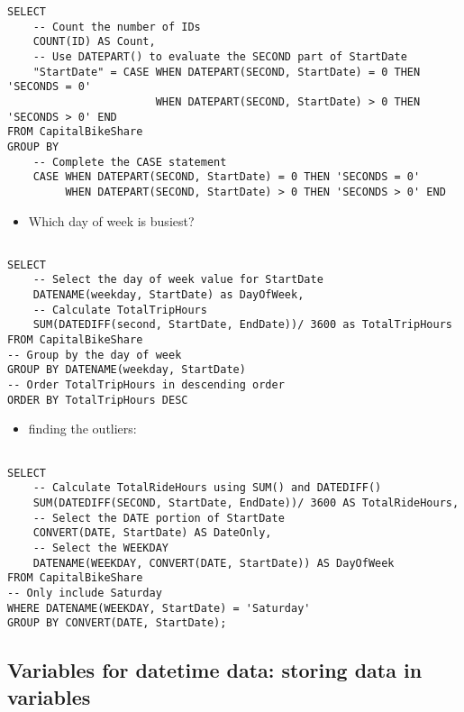 \documentclass[]{book}
\providecommand{\tightlist}{%
  \setlength{\itemsep}{0pt}\setlength{\parskip}{0pt}}
\begin{document}
\begin{verbatim}
SELECT
	-- Count the number of IDs
	COUNT(ID) AS Count,
    -- Use DATEPART() to evaluate the SECOND part of StartDate
    "StartDate" = CASE WHEN DATEPART(SECOND, StartDate) = 0 THEN 'SECONDS = 0'
					   WHEN DATEPART(SECOND, StartDate) > 0 THEN 'SECONDS > 0' END
FROM CapitalBikeShare
GROUP BY
    -- Complete the CASE statement
	CASE WHEN DATEPART(SECOND, StartDate) = 0 THEN 'SECONDS = 0'
		 WHEN DATEPART(SECOND, StartDate) > 0 THEN 'SECONDS > 0' END
\end{verbatim}

\begin{itemize}
\tightlist
\item
  Which day of week is busiest?
\end{itemize}

\begin{verbatim}

SELECT
    -- Select the day of week value for StartDate
	DATENAME(weekday, StartDate) as DayOfWeek,
    -- Calculate TotalTripHours
	SUM(DATEDIFF(second, StartDate, EndDate))/ 3600 as TotalTripHours 
FROM CapitalBikeShare 
-- Group by the day of week
GROUP BY DATENAME(weekday, StartDate)
-- Order TotalTripHours in descending order
ORDER BY TotalTripHours DESC
\end{verbatim}

\begin{itemize}
\tightlist
\item
  finding the outliers:
\end{itemize}

\begin{verbatim}

SELECT
	-- Calculate TotalRideHours using SUM() and DATEDIFF()
  	SUM(DATEDIFF(SECOND, StartDate, EndDate))/ 3600 AS TotalRideHours,
    -- Select the DATE portion of StartDate
  	CONVERT(DATE, StartDate) AS DateOnly,
    -- Select the WEEKDAY
  	DATENAME(WEEKDAY, CONVERT(DATE, StartDate)) AS DayOfWeek 
FROM CapitalBikeShare
-- Only include Saturday
WHERE DATENAME(WEEKDAY, StartDate) = 'Saturday' 
GROUP BY CONVERT(DATE, StartDate);
\end{verbatim}

\hypertarget{variables-for-datetime-data-storing-data-in-variables}{%
\subsection{Variables for datetime data: storing data in variables}\label{variables-for-datetime-data-storing-data-in-variables}}
\end{document}
